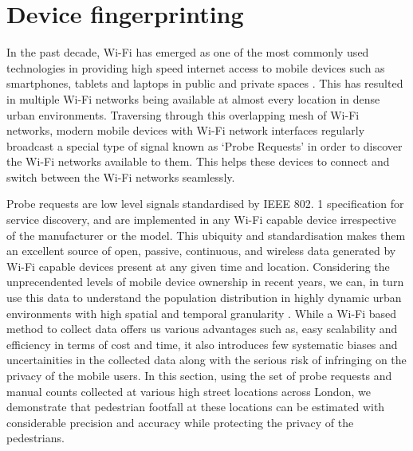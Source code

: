 \section{Device fingerprinting}

In the past decade, Wi-Fi has emerged as one of the most commonly used technologies in providing high speed internet access to mobile devices such as smartphones, tablets and laptops in public and private spaces \citep{torrens2008wi}.
This has resulted in multiple Wi-Fi networks being available at almost every location in dense urban environments.
Traversing through this overlapping mesh of Wi-Fi networks, modern mobile devices with Wi-Fi network interfaces regularly broadcast a special type of signal known as `Probe Requests' in order to discover the Wi-Fi networks available to them.
This helps these devices to connect and switch between the Wi-Fi networks seamlessly.

Probe requests are low level signals standardised by IEEE 802.
1 specification \citep{ieee2016} for service discovery, and are implemented in any Wi-Fi capable device irrespective of the manufacturer or the model.
This ubiquity and standardisation makes them an excellent source of open, passive, continuous, and wireless data generated by Wi-Fi capable devices present at any given time and location.
Considering the unprecendented levels of mobile device ownership in recent years, we can, in turn use this data to understand the population distribution in highly dynamic urban environments with high spatial and temporal granularity \citep{freud2015, konto2017}.
While a Wi-Fi based method to collect data offers us various advantages such as, easy scalability and efficiency in terms of cost and time, it also introduces few systematic biases and uncertainities in the collected data along with the serious risk of infringing on the privacy of the mobile users.
In this section, using the set of probe requests and manual counts collected at various high street locations across London, we demonstrate that pedestrian footfall at these locations can be estimated with considerable precision and accuracy while protecting the privacy of the pedestrians.

